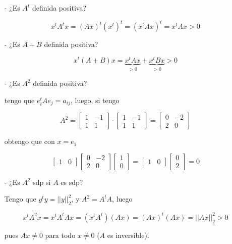\begin{itemize}
    \item[-] ¿Es $A^t$ definida positiva?

    \[x^{t}A^{t}x = {(Ax)}^{t}{(x^t)}^{t} = {(x^{t}Ax)}^{t} = x^{t}Ax > 0\]

    \item[-] ¿Es $A+B$ definida positiva?

    \[x^{t}(A+B)x = \underbrace{x^{t}Ax}_{ > 0} + \underbrace{x^{t}Bx}_{ > 0} > 0\]

    \item[-] ¿Es $A^2$ definida positiva?

    tengo que $e^{t}_{i}Ae_{j} = a_{ij}$, luego, si tengo 

    \[A^2 = 
    \begin{bmatrix}
        1 & -1 \\
        1 & 1
    \end{bmatrix}
    \cdot
    \begin{bmatrix}
        1 & -1 \\
        1 & 1
    \end{bmatrix}
    =
    \begin{bmatrix}
        0 & -2 \\
        2 & 0
    \end{bmatrix}
    \]

    obtengo que con $x = e_1$

    \[
    \begin{bmatrix}
        1 & 0
    \end{bmatrix}
    \begin{bmatrix}
        0 & -2 \\
        2 & 0
    \end{bmatrix}
    \begin{bmatrix}
        1 \\ 0
    \end{bmatrix}
    =
    \begin{bmatrix}
        1 & 0
    \end{bmatrix}
    \begin{bmatrix}
        0 \\ 2
    \end{bmatrix}
    = 0
    \]    

    \item[-] ¿Es $A^2$ sdp si $A$ es sdp?

    Tengo que $y^{t}y = {||y||}_{2}^{2}$, y $A^{2} = A^{t}A$, luego

    \[x^{t}A^{2}x = x^{t}A^{t}Ax = (x^{t}A^{t})(Ax) = {(Ax)}^{t}(Ax) = {||Ax||}^{2}_{2} > 0\]

    pues $Ax \neq 0$ para todo $x \neq 0$ ($A$ es inversible).

\end{itemize}

